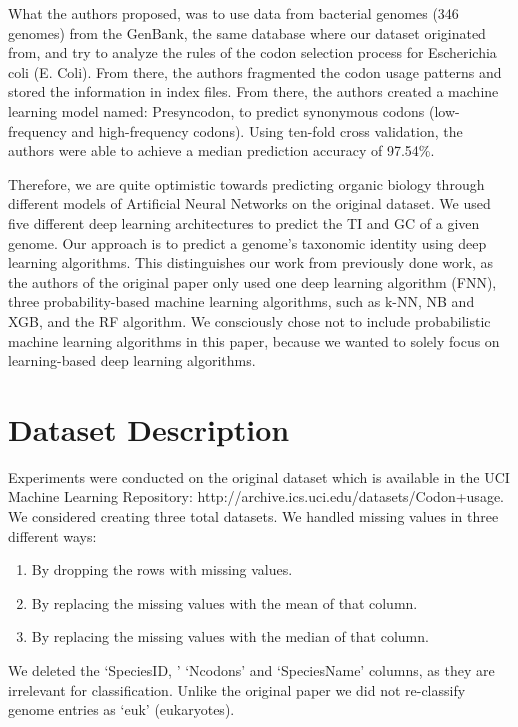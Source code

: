 \documentclass[conference]{IEEEtran}
\begin{document}
What the authors proposed, was to use data from bacterial genomes (346 genomes) from the GenBank\cite{GenBank}, the same database where our dataset originated from, and try to analyze the rules of the codon selection process for Escherichia coli (E. Coli). From there, the authors fragmented the codon usage patterns and stored the information in index files. From there, the authors created a machine learning model named: Presyncodon, to predict synonymous codons (low-frequency and high-frequency codons). Using ten-fold cross validation, the authors were able to achieve a median prediction accuracy of 97.54\%.

Therefore, we are quite optimistic towards predicting organic biology\cite{Lee}\cite{Kroll}\cite{Washburn} through different models of Artificial Neural Networks \cite{Dastres} on the original dataset. We used five different deep learning architectures to predict the TI and GC of a given genome. Our approach is to predict a genome’s taxonomic identity using deep learning algorithms. This distinguishes our work from previously done work, as the authors of the original paper only used one deep learning algorithm (FNN), three probability-based machine learning algorithms\cite{Taskar}, such as k-NN, NB and XGB, and the RF algorithm. We consciously chose not to include probabilistic machine learning algorithms in this paper, because we wanted to solely focus on learning-based deep learning algorithms\cite{Sarker}\cite{Sirignano}.


\section{Dataset Description}
Experiments were conducted on the original dataset which is available in the UCI Machine Learning Repository: http://archive.ics.uci.edu/datasets/Codon+usage. 
We considered creating three total datasets. We handled missing values in three different ways:

\begin{enumerate}
\item{By dropping the rows with missing values.}
\item{By replacing the missing values with the mean of that column.}
\item{By replacing the missing values with the median of that column. }
\end{enumerate}

We deleted the ‘SpeciesID, ’ ‘Ncodons’ and ‘SpeciesName’ columns, as they are irrelevant for classification. Unlike the original paper we did not re-classify genome entries as ‘euk’ (eukaryotes). 
\end{document}
